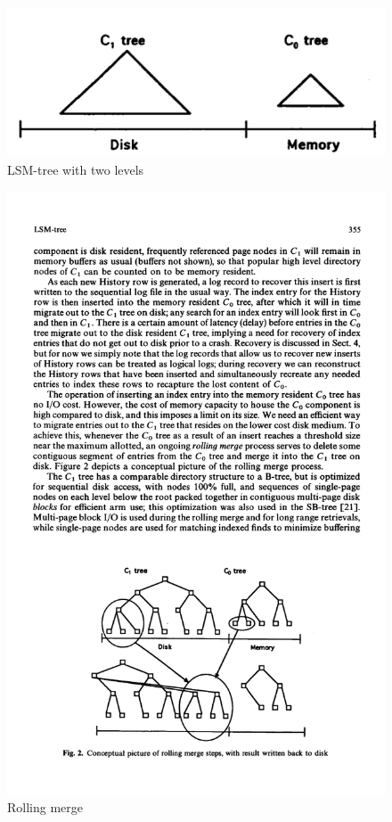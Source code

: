 \begin{figure}[ht]
    \centering
    \includegraphics[scale=0.3]{figures/LSM.png}
    \caption{LSM-tree with two levels\cite{LSMTree}}
    \label{fig:LSMTree}
\end{figure}

\begin{figure}[ht]
    \centering
    \includegraphics[scale=0.7]{figures/merge_LSM.pdf}
    \caption{Rolling merge\cite{LSMTree}}
    \label{fig:LSMMerge}
\end{figure}

